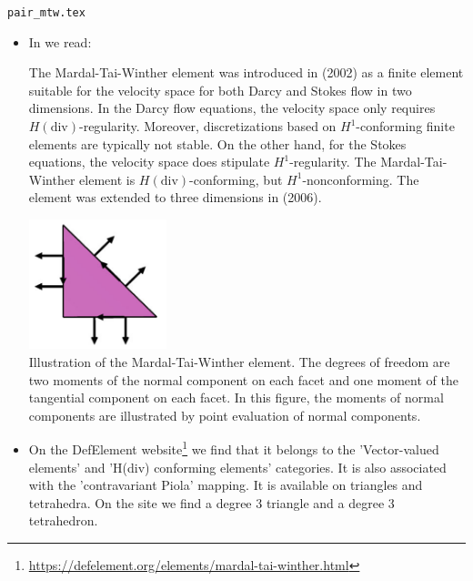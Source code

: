 \begin{flushright} {\tiny {\color{gray} \tt pair\_mtw.tex}} \end{flushright}

\begin{itemize}

\item In \textcite{lomw12} we read:

\begin{displayquote}
{\color{darkgray}
The Mardal-Tai-Winther element was introduced in \textcite{matw02} (2002) as a finite element suitable
for the velocity space for both Darcy and Stokes flow in two dimensions. In the Darcy flow equations,
the velocity space only requires $H(\text{div})$-regularity. Moreover, discretizations based on $H^1$-conforming
finite elements are typically not stable. On the other hand, for the Stokes equations, the velocity 
space does stipulate $H^1$-regularity. The Mardal-Tai-Winther element is $H(\text{div})$-conforming, but
$H^1$-nonconforming. The element was extended to three dimensions in \textcite{tawi06} (2006).

\begin{center}
\includegraphics[width=4cm]{images/pair_mtw/mtw_lomw12}\\
{\captionfont 
Illustration of the Mardal-Tai-Winther element. The degrees of freedom are two moments
of the normal component on each facet and one moment of the tangential component on each facet.
In this figure, the moments of normal components are illustrated by point evaluation of normal
components.}
\end{center}

}
\end{displayquote}

\item On the DefElement website\footnote{\url{https://defelement.org/elements/mardal-tai-winther.html}}
we find that it belongs to the 'Vector-valued elements' and  'H(div) conforming elements' categories.
It is also associated with the 'contravariant Piola' mapping.
It is available on triangles and tetrahedra.
On the site we find a degree 3 triangle and a degree 3 tetrahedron.



\end{itemize}
